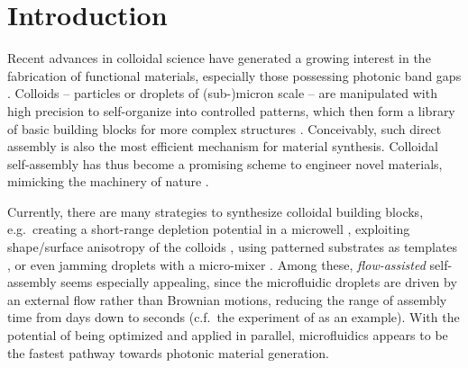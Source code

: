 





\section{Introduction}

Recent advances in colloidal science have generated a growing interest in the fabrication of functional materials, especially those possessing photonic band gaps \citep{PRL1990, PBM1999, ZnO2003, colloidal2003, Shen_2016AS}. Colloids --  particles or droplets of (sub-)micron scale -- are manipulated with high precision to self-organize into controlled patterns, which then form a library of basic building blocks for more complex structures \citep{Sacanna_Pine_2011}. Conceivably, such direct assembly is also the most efficient mechanism for material synthesis. Colloidal self-assembly has thus become a promising scheme to engineer novel materials, mimicking the machinery of nature \citep{vanBlaaderen}. 

Currently, there are many strategies to synthesize colloidal building blocks, e.g.\ creating a short-range depletion potential in a microwell \citep{Meng2010}, exploiting shape/surface anisotropy of the colloids \citep{Sacanna_Pine_2011, Evers2016}, using patterned substrates as templates \citep{Yin2001}, or even jamming droplets with a micro-mixer \citep{Joshua_2017PRL}. Among these, \textit{flow-assisted} self-assembly seems especially appealing, since the microfluidic droplets are driven by an external flow rather than Brownian motions, reducing the range of assembly time from days down to seconds (c.f.\ the experiment of \citep{McMullen2018} as an example). With the potential of being optimized and applied in parallel, microfluidics appears to be the fastest pathway towards photonic material generation.

